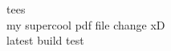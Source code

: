 \documentclass[12pt,a4paper,oneside,dvipsnames]{article}
\begin{document}
tees\\
my supercool pdf file change xD\\
latest build test\\

\end{document}
